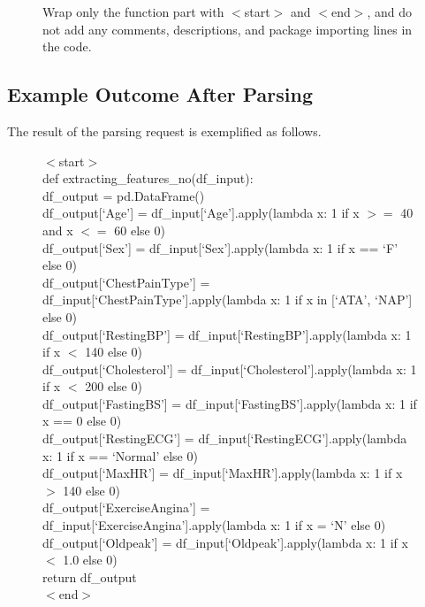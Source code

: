 \documentclass{article}
\theoremstyle{plain}
\theoremstyle{definition}
\theoremstyle{remark}
\begin{document}
\begin{figure}[ht!]
\begin{tcolorbox}[enhanced,attach boxed title to top center={yshift=-3mm,yshifttext=-1mm},
  colback=black!0!white, colframe=black!20!white, colbacktitle=black!10!white, coltitle=blue!20!black ]
{Wrap only the function part with $<$start$>$ and $<$end$>$, and do not add any comments, descriptions, and package importing lines in the code.
}
\end{tcolorbox}
\label{fig:appendix-parse_rules}            
\end{figure}

\newpage

\subsection{Example Outcome After Parsing}
\label{sec:example_parse_outcome}
The result of the parsing request is exemplified as follows.

\begin{figure}[ht!]
\begin{tcolorbox}[enhanced,attach boxed title to top center={yshift=-3mm,yshifttext=-1mm},
  colback=black!0!white, colframe=black!20!white, colbacktitle=black!10!white, coltitle=blue!20!black ]
\footnotesize{
$<$start$>$\\
def extracting\_features\_no(df\_input): \\

\hangindent=0.7cm
\parindent=0.7cm df\_output = pd.DataFrame() \\
df\_output[`Age'] = df\_input[`Age'].apply(lambda x: 1 if x $>=$ 40 and x $<=$ 60 else 0)\\
df\_output[`Sex'] = df\_input[`Sex'].apply(lambda x: 1 if x == `F' else 0)\\
df\_output[`ChestPainType'] = df\_input[`ChestPainType'].apply(lambda x: 1 if x in [`ATA', `NAP'] else 0)\\
df\_output[`RestingBP'] = df\_input[`RestingBP'].apply(lambda x: 1 if x $<$ 140 else 0)\\
df\_output[`Cholesterol'] = df\_input[`Cholesterol'].apply(lambda x: 1 if x $<$ 200 else 0)\\
df\_output[`FastingBS'] = df\_input[`FastingBS'].apply(lambda x: 1 if x == 0 else 0)\\
df\_output[`RestingECG'] = df\_input[`RestingECG'].apply(lambda x: 1 if x == `Normal' else 0)\\
df\_output[`MaxHR'] = df\_input[`MaxHR'].apply(lambda x: 1 if x $>$ 140 else 0)\\
df\_output[`ExerciseAngina'] = df\_input[`ExerciseAngina'].apply(lambda x: 1 if x = `N' else 0)\\
df\_output[`Oldpeak'] = df\_input[`Oldpeak'].apply(lambda x: 1 if x $<$ 1.0 else 0)\\
    
return df\_output \\
\hangindent=0cm
$<$end$>$
}
\end{tcolorbox}
\label{fig:appendix-parse_outcomes}            
\end{figure}
\end{document}
